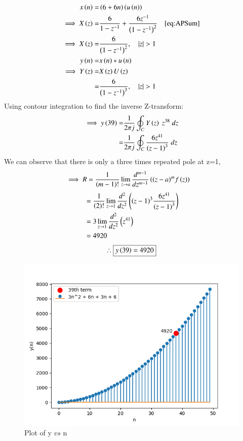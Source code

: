 \documentclass[journal,12pt,twocolumn]{IEEEtran}
\theoremstyle{remark}
\begin{document}
\begin{align}
x\brak{n}= &\brak{6+6n}\brak{u\brak{n}}\\
\implies X\brak{z}= &\frac6{1-z^{-1}} + \frac{6z^{-1}}{\brak{1-z^{-1}}^{2}} \quad\eqref{eq:APSum}\\
\implies X\brak{z}=& \frac6{{\brak{1-z^{-1}}}^2} ,\quad |z|>1\\
y\brak{n}=& x\brak{n}* u\brak{n}\\
\implies Y\brak{z}=& X\brak{z}U\brak{z} \\
=& \frac{6}{\brak{1-z^{-1}}^{3}}, \quad |z|>1
\end{align}
Using contour integration to find the inverse Z-transform:\\
\begin{align}
    \implies y\left(39\right)=&\dfrac{1}{2\pi j}\oint_{C}Y\left(z\right) \;z^{38} \;dz\\
    =&\dfrac{1}{2\pi j}\oint_{C}\dfrac{6z^{41}}{\left({z-1}\right)^{3}} \;dz 
\end{align}
We can observe that there is only a three times repeated pole at z=1,
\begin{align}
    \implies R&=\dfrac{1}{\left(m-1\right)!}\lim\limits_{z\to a}\dfrac{d^{m-1}}{dz^{m-1}}\left({\left(z-a\right)}^{m}f\left(z\right)\right)  
\end{align}
\begin{align}
    &=\dfrac{1}{\left(2\right)!}\lim\limits_{z\to 1}\dfrac{d^{2}}{dz^{2}}\left({\left(z-1\right)}^{3}\dfrac{6z^{41}}{{\left(z-1\right)}^3}\right)   \\
    &=3\lim\limits_{z\to 1}\dfrac{d^2}{dz^2}\left(z^{41}\right)\\
    &=4920
\end{align}
\begin{align}
    \therefore \boxed{y\left(39\right)=4920}
\end{align}
\begin{figure}[ht]
    \centering
    \includegraphics[width=\columnwidth]{figs/fig1.png}
    \caption{Plot of y $vs$ n}
    \label{fig: 10.5.3.12}
\end{figure}
\end{document}
